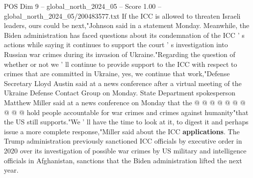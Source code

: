 \begin{textsample}{POS Dim 9 – global\_north\_2024\_05 – Score 1.00 – global\_north\_2024\_05/200483577.txt}
If the ICC is allowed to threaten Israeli leaders, ours could be next,"Johnson said in a statement Monday.
Meanwhile, the Biden administration has faced questions about its condemnation of the ICC ' s actions while saying it continues to support the court ' s investigation into Russian war crimes during its invasion of Ukraine."Regarding the question of whether or not we ' ll continue to provide support to the ICC with respect to crimes that are committed in Ukraine, yes, we continue that work,"Defense Secretary Lloyd Austin said at a news conference after a virtual meeting of the Ukraine Defense Contact Group on Monday.
State Department spokesperson Matthew Miller said at a news conference on Monday that the @ @ @ @ @ @ @ @ @ @ hold people accountable for war crimes and crimes against humanity"that the US still supports."We ' ll have the time to look at it, to digest it and perhaps issue a more complete response,"Miller said about the ICC \textbf{applications}.
The Trump administration previously sanctioned ICC officials by executive order in 2020 over its investigation of possible war crimes by US military and intelligence officials in Afghanistan, sanctions that the Biden administration lifted the next year.

\end{textsample}
